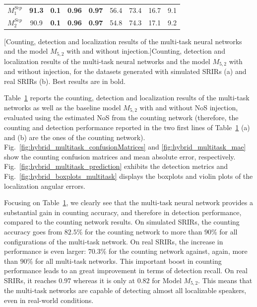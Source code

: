 \begin{table}[t]
{\begin{adjustbox}{width=1.2\textwidth,center}
\begin{tabular}{|c|cc|cc|cccc|}
                $M^{Sep}_1$                           & \textbf{91.3}                           & \textbf{0.1}                  & \textbf{0.96}                       & \textbf{0.97}                    & 56.4                   & 73.4                   & 16.7                  & 9.1                     \\
                $M^{Sep}_2$                           & 90.9                                    & \textbf{0.1}                  & \textbf{0.96}                       & \textbf{0.97}                    & 54.8                   & 74.3                   & 17.1                  & 9.2                     \\ \hline
            \end{tabular}
        \end{adjustbox}
    }
    [Counting, detection and localization results of the multi-task neural networks and the model $M_{5,2}$ with and without injection.]{Counting, detection and localization results of the multi-task neural networks and the model $M_{5,2}$ with and without injection, for the datasets generated with simulated SRIRs (a) and real SRIRs (b). Best results are in bold.}
    \label{tab:hybrid_multitask_results}
\end{table}

Table~\ref{tab:hybrid_multitask_results} reports the counting, detection and localization results of the multi-task networks as well as the baseline model $M_{5,2}$ with and without NoS injection, evaluated using the estimated NoS from the counting network  (therefore, the counting and detection performance reported in the two first lines of Table~\ref{tab:hybrid_multitask_results} (a) and (b) are the ones of the counting network). Fig.~\ref{fig:hybrid_multitask_confusionMatrices} and \ref{fig:hybrid_multitask_mae} show the counting confusion matrices and mean absolute error, respectively. Fig.~\ref{fig:hybrid_multitask_prediction} exhibits the detection metrics and Fig.~\ref{fig:hybrid_boxplots_multitask} displays the boxplots and violin plots of the localization angular errors.

Focusing on Table~\ref{tab:hybrid_multitask_results}, we clearly see that the multi-task neural network provides a substantial gain in counting accuracy, and therefore in detection performance, compared to the counting network results. On simulated SRIRs, the counting accuracy goes from $82.5$\% for the counting network to more than $90$\% for all configurations of the multi-task network. On real SRIRs, the increase in performance is even larger: $70.3$\% for the counting network against, again, more than $90$\% for all multi-task networks. This important boost in counting performance leads to an great improvement in terms of detection recall. On real SRIRs, it reaches $0.97$ whereas it is only at $0.82$ for Model $M_{5,2}$. This means that the multi-task networks are capable of detecting almost all localizable speakers, even in real-world conditions.


